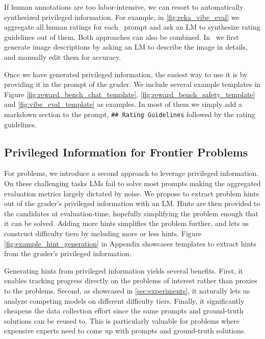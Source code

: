 If human annotations are too labor-intensive, we can resort to automatically synthesized privileged information.
For example, in \cref{fig:reka_vibe_eval} we aggregate all human ratings for each \VibeEval~prompt and ask an LM to synthesize rating guidelines out of them.
Both approaches can also be combined.
In \VibeEval~we first generate image descriptions by asking an LM to describe the image in details, and manually edit them for accuracy.

Once we have generated privileged information, the easiest way to use it is by providing it in the prompt of the grader.
We include several example templates in Figure \ref{fig:reward_bench_chat_template}, \ref{fig:reward_bench_safety_template} and \ref{fig:vibe_eval_template} as examples.
In most of them we simply add a markdown section to the prompt, \eg \texttt{\#\# Rating Guidelines} followed by the rating guidelines.

\subsection{Privileged Information for Frontier Problems}
\label{sec:method-hints}

For \NS problems, we introduce a second approach to leverage privileged information.
On these challenging tasks LMs fail to solve most prompts making the aggregated evaluation metrics largely dictated by noise.
We propose to extract problem hints out of the grader's privileged information with an LM.
Hints are then provided to the candidates at evaluation-time, hopefully simplifying the problem enough that it can be solved.
Adding more hints simplifies the problem further, and lets us construct difficulty tiers by including more or less hints.
Figure \ref{fig:example_hint_generation} in Appendix showcases templates to extract hints from the grader's privileged information.

Generating hints from privileged information yields several benefits.
First, it enables tracking progress directly on the \NS problems of interest rather than proxies to the \NS problems.
Second, as showcased in \cref{sec:experiments}, it naturally lets us analyze competing models on different difficulty tiers.
Finally, it significantly cheapens the data collection effort since the same prompts and ground-truth solutions can be reused to. 
This is particularly valuable for \NS problems where expensive experts need to come up with prompts and ground-truth solutions.
